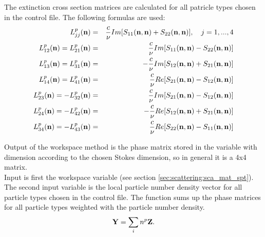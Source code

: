The extinction cross section matrices \SExMat{} are
calculated for all patricle types chosen in the control
file. The following formulas are used:
\begin{eqnarray}
  \label{eq:gen_ext_matrix}
  L^p_{jj}({\bf n}) &=& \frac{c}{\nu} Im[S_{11}({\bf n},{\bf
    n})+S_{22}({\bf n},{\bf n})], \quad j=1,...,4 \\
  L^p_{12}({\bf n}) = L^p_{21}({\bf n}) &=& \frac{c}{\nu} Im[S_{11}({\bf n},{\bf
    n})-S_{22}({\bf n},{\bf n})]\\
  L^p_{13}({\bf n}) = L^p_{31}({\bf n}) &=& -\frac{c}{\nu} Im[S_{12}({\bf n},{\bf
    n})+S_{21}({\bf n},{\bf n})]\\
  L^p_{14}({\bf n}) = L^p_{41}({\bf n}) &=& \frac{c}{\nu} Re[S_{21}({\bf n},{\bf
    n})-S_{12}({\bf n},{\bf n})]\\
  L^p_{23}({\bf n}) = -L^p_{32}({\bf n}) &=& \frac{c}{\nu} Im[S_{21}({\bf n},{\bf
    n})-S_{12}({\bf n},{\bf n})]\\
  L^p_{24}({\bf n}) = -L^p_{42}({\bf n}) &=& -\frac{c}{\nu} Re[S_{12}({\bf n},{\bf
    n})+S_{21}({\bf n},{\bf n})]\\
  L^p_{34}({\bf n}) = -L^p_{43}({\bf n}) &=& \frac{c}{\nu} Re[S_{22}({\bf n},{\bf
    n})-S_{11}({\bf n},{\bf n})]
\end{eqnarray}


\label{sec:scattering:tot_sca_mat}

\label{sec:scattering:sca_mat}

Output of the workspace method  is the phase
matrix stored in the variable   with dimension
according to the chosen Stokes
dimension, so in general it is a 4x4 matrix.\\
Input is first the workspace variable  (see section
\ref{sec:scattering:sca_mat_spt}). The second input variable is the
local particle number density vector  for all particle types
chosen in the control file.
The function sums up the phase matrices for all particle types
weighted with the particle number density.
\begin{eqnarray}
{\bf Y} = \sum_i{n^p{\bf Z}}.
\end{eqnarray}

\label{sec:scattering:sca_mat_spt}

